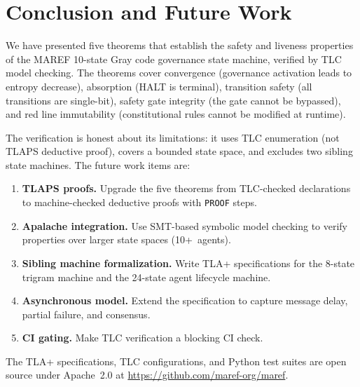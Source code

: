 \documentclass[11pt]{article}
\begin{document}
\section{Conclusion and Future Work}

We have presented five theorems that establish the safety and liveness
properties of the MAREF 10-state Gray code governance state machine, verified
by TLC model checking. The theorems cover convergence (governance activation
leads to entropy decrease), absorption (HALT is terminal), transition safety
(all transitions are single-bit), safety gate integrity (the gate cannot be
bypassed), and red line immutability (constitutional rules cannot be modified
at runtime).

The verification is honest about its limitations: it uses TLC enumeration
(not TLAPS deductive proof), covers a bounded state space, and excludes two
sibling state machines. The future work items are:

\begin{enumerate}
  \item \textbf{TLAPS proofs.} Upgrade the five theorems from TLC-checked
    declarations to machine-checked deductive proofs with \texttt{PROOF} steps.
  \item \textbf{Apalache integration.} Use SMT-based symbolic model checking
    to verify properties over larger state spaces (10+~agents).
  \item \textbf{Sibling machine formalization.} Write TLA+ specifications for
    the 8-state trigram machine and the 24-state agent lifecycle machine.
  \item \textbf{Asynchronous model.} Extend the specification to capture
    message delay, partial failure, and consensus.
  \item \textbf{CI gating.} Make TLC verification a blocking CI check.
\end{enumerate}

The TLA+ specifications, TLC configurations, and Python test suites are open
source under Apache~2.0 at \url{https://github.com/maref-org/maref}.



\end{document}
